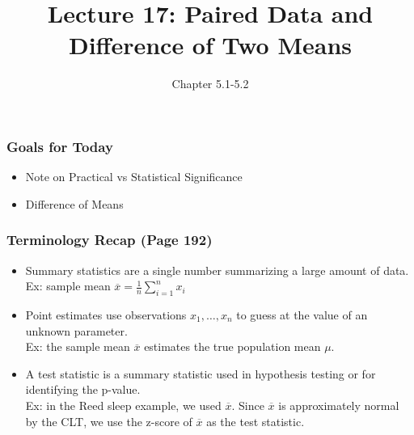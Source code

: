 \documentclass[handout]{beamer}
\title{Lecture 17: Paired Data and Difference of Two Means}
\author{Chapter 5.1-5.2}
\date{}
\newcommand{\blue}[1]{\textcolor{blue2}{#1}}
\newcommand{\xbar}{\overline{x}}
\begin{document}
\begin{frame}
\titlepage
\end{frame}



\begin{frame}[fragile]
\frametitle{Goals for Today}

\begin{itemize}
\item Note on Practical vs Statistical Significance
\item Difference of Means
\end{itemize}

\end{frame}




\begin{frame}[fragile]
\frametitle{Terminology Recap (Page 192)}

\begin{itemize}
\pause\item \blue{Summary statistics} are a single number summarizing a large amount of data.\\
Ex: sample mean $\xbar=\frac{1}{n}\sum_{i=1}^{n}x_i$
\pause\item \blue{Point estimates} use observations $x_1,\ldots,x_n$ to guess at the value of an unknown parameter.  \\
Ex:  the sample mean $\xbar$ estimates the true population mean $\mu$.  
\pause\item A \blue{test statistic} is a summary statistic used in hypothesis testing or for identifying the p-value.\\
Ex:  in the Reed sleep example, we used $\xbar$.  Since $\xbar$ is approximately normal by the CLT, we use the z-score of $\xbar$ as the test statistic.  
\end{itemize}

\end{frame}
\end{document}

